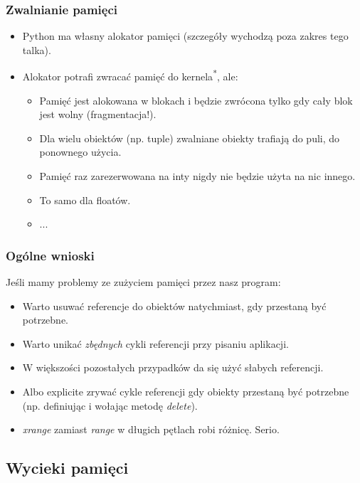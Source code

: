 \documentclass{beamer}
\begin{document}
    \begin{frame}
        \frametitle{Zwalnianie pamięci}
        \begin{itemize}
            \item Python ma własny alokator pamięci (szczegóły wychodzą poza zakres tego talka).
            \item Alokator potrafi zwracać pamięć do kernela\textsuperscript{*}, ale:
            \begin{itemize}
                \item Pamięć jest alokowana w blokach i będzie zwrócona tylko gdy cały blok jest wolny (fragmentacja!).
                \item Dla wielu obiektów (np. tuple) zwalniane obiekty trafiają do puli, do ponownego użycia.
                \item Pamięć raz zarezerwowana na inty nigdy nie będzie użyta na nic innego.
                \item To samo dla floatów.
                \item ...
            \end{itemize}
        \end{itemize}
    \end{frame}

    \begin{frame}
        \frametitle{Ogólne wnioski}
        Jeśli mamy problemy ze zużyciem pamięci przez nasz program:
        \begin{itemize}
            \item Warto usuwać referencje do obiektów natychmiast, gdy przestaną być potrzebne.
            \item Warto unikać \textit{zbędnych} cykli referencji przy pisaniu aplikacji.
            \item W większości pozostałych przypadków da się użyć słabych referencji.
            \item Albo explicite zrywać cykle referencji gdy obiekty przestaną być potrzebne (np. definiując i wołając metodę \textit{delete}).
            \item \textit{xrange} zamiast \textit{range} w długich pętlach robi różnicę. Serio.
        \end{itemize}
    \end{frame}

\subsection{Wycieki pamięci}
\frame\subsectionpage
\end{document}
